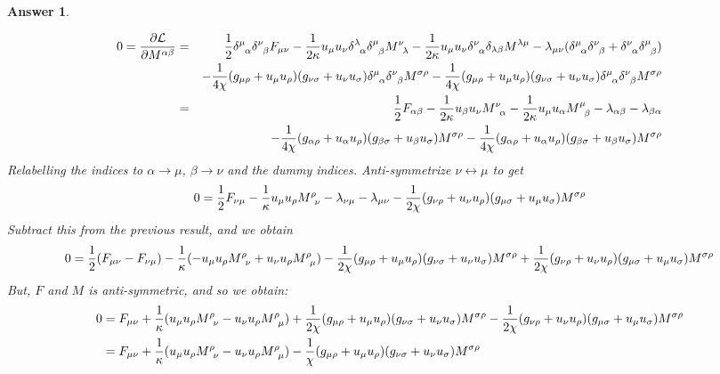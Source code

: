 \documentclass[a4paper]{article}
\newtheorem{ans}{Answer}[section]
\theoremstyle{new}
\begin{document}
\begin{ans}
\begin{enumerate}[label=(\alph*)]
\begin{eqnarray}
0=\frac{\partial\mathcal{L}}{\partial M^{\alpha\beta}}&=&\frac{1}{2}\tensor*{\delta}{*_{}^{\mu}_{\alpha}}\tensor*{\delta}{*_{}^{\nu}_{\beta}}F_{\mu\nu}-\frac{1}{2\kappa}u_\mu u_\nu \tensor*{\delta}{*_{}^{\lambda}_{\alpha}}\tensor*{\delta}{*_{}^{\mu}_{\beta}}\tensor*{M}{*_{}^{\nu}_{\lambda}}-\frac{1}{2\kappa}u_\mu u_\nu\tensor*{\delta}{*_{}^{\nu}_{\alpha}}\delta_{\lambda\beta}M^{\lambda\mu}-\lambda_{\mu\nu}(\tensor*{\delta}{*_{}^{\mu}_{\alpha}}\tensor*{\delta}{*_{}^{\nu}_{\beta}}+\tensor*{\delta}{*_{}^{\nu}_{\alpha}}\tensor*{\delta}{*_{}^{\mu}_{\beta}})\nonumber\\&&-\frac{1}{4\chi}(g_{\mu\rho}+u_\mu u_\rho)(g_{\nu\sigma}+u_\nu u_\sigma)\tensor*{\delta}{*_{}^{\mu}_{\alpha}}\tensor*{\delta}{*_{}^{\nu}_{\beta}}M^{\sigma\rho}-\frac{1}{4\chi}(g_{\mu\rho}+u_\mu u_\rho)(g_{\nu\sigma}+u_\nu u_\sigma)\tensor*{\delta}{*_{}^{\mu}_{\alpha}}\tensor*{\delta}{*_{}^{\nu}_{\beta}}M^{\sigma\rho}\nonumber\\&=&\frac{1}{2}F_{\alpha\beta}-\frac{1}{2\kappa}u_\beta u_\nu \tensor*{M}{*_{}^{\nu}_{\alpha}}-\frac{1}{2\kappa} u_\mu u_\alpha \tensor*{M}{*_{}^{\mu}_{\beta}}-\lambda_{\alpha\beta}-\lambda_{\beta\alpha}\nonumber\\&&-\frac{1}{4\chi}(g_{\alpha\rho}+u_\alpha u_\rho)(g_{\beta\sigma}+u_\beta u_\sigma)M^{\sigma\rho}-\frac{1}{4\chi}(g_{\alpha\rho}+u_\alpha u_\rho)(g_{\beta\sigma}+u_\beta u_\sigma)M^{\sigma\rho}\nonumber
\end{eqnarray}
Relabelling the indices to $\alpha\rightarrow\mu$, $\beta\rightarrow\nu$ and the dummy indices. Anti-symmetrize $\nu\leftrightarrow\mu$ to get
$$0=\frac{1}{2}F_{\nu\mu}-\frac{1}{\kappa}u_\mu u_\rho\tensor*{M}{*_{}^{\rho}_{\nu}}-\lambda_{\nu\mu}-\lambda_{\mu\nu}-\frac{1}{2\chi}(g_{\nu\rho}+u_\nu u_\rho)(g_{\mu\sigma}+u_\mu u_\sigma)M^{\sigma\rho}$$
Subtract this from the previous result, and we obtain
$$0=\frac{1}{2}(F_{\mu\nu}-F_{\nu\mu})-\frac{1}{\kappa}(-u_\mu u_\rho\tensor*{M}{*_{}^{\rho}_{\nu}}+u_\nu u_\rho\tensor*{M}{*_{}^{\rho}_{\mu}})-\frac{1}{2\chi}(g_{\mu\rho}+u_\mu u_\rho)(g_{\nu\sigma}+u_\nu u_\sigma)M^{\sigma\rho}+\frac{1}{2\chi}(g_{\nu\rho}+u_\nu u_\rho)(g_{\mu\sigma}+u_\mu u_\sigma)M^{\sigma\rho}$$
But, $F$ and $M$ is anti-symmetric, and so we obtain:
\begin{align}
0&=F_{\mu\nu}+\frac{1}{\kappa}(u_\mu u_\rho\tensor*{M}{*_{}^{\rho}_{\nu}}-u_\nu u_\rho\tensor*{M}{*_{}^{\rho}_{\mu}})+\frac{1}{2\chi}(g_{\mu\rho}+u_\mu u_\rho)(g_{\nu\sigma}+u_\nu u_\sigma)M^{\sigma\rho}-\frac{1}{2\chi}(g_{\nu\rho}+u_\nu u_\rho)(g_{\mu\sigma}+u_\mu u_\sigma)M^{\sigma\rho}\nonumber\\&=F_{\mu\nu}+\frac{1}{\kappa}(u_\mu u_\rho\tensor*{M}{*_{}^{\rho}_{\nu}}-u_\nu u_\rho\tensor*{M}{*_{}^{\rho}_{\mu}})-\frac{1}{\chi}(g_{\mu\rho}+u_\mu u_\rho)(g_{\nu\sigma}+u_\nu u_\sigma)M^{\sigma\rho}\nonumber

\end{align}
\end{enumerate}
\end{ans}
\end{document}
